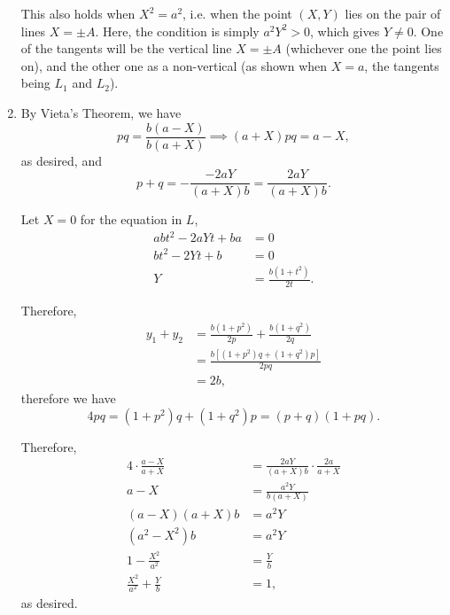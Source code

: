 \begin{enumerate}
    This also holds when \(X^2 = a^2\), i.e. when the point \((X, Y)\) lies on the pair of lines \(X = \pm A\). Here, the condition is simply \(a^2 Y^2 > 0\), which gives \(Y \neq 0\). One of the tangents will be the vertical line \(X = \pm A\) (whichever one the point lies on), and the other one as a non-vertical (as shown when \(X = a\), the tangents being \(L_1\) and \(L_2\)).

    \begin{center}
        
    \end{center}

    \item By Vieta's Theorem, we have
    \[
        pq = \frac{b(a-X)}{b(a+X)} \implies (a+X) pq = a-X,
    \]
    as desired, and
    \[
        p + q = -\frac{-2aY}{(a+X)b} = \frac{2aY}{(a+X)b}.
    \]

    Let \(X = 0\) for the equation in \(L\),
    \begin{align*}
        abt^2 - 2aYt + ba &= 0\\
        bt^2 - 2Yt + b &= 0\\
        Y &= \frac{b(1+t^2)}{2t}.
    \end{align*}

    Therefore,
    \begin{align*}
        y_1 + y_2 &= \frac{b(1+p^2)}{2p} + \frac{b(1+q^2)}{2q}\\
        &= \frac{b\left[(1+p^2)q + (1+q^2)p\right]}{2pq}\\
        &= 2b,
    \end{align*}
    therefore we have
    \[
        4pq = (1+p^2)q + (1+q^2)p = (p+q)(1 + pq).
    \]

    Therefore,
    \begin{align*}
        4 \cdot \frac{a-X}{a+X} &= \frac{2aY}{(a+X)b} \cdot \frac{2a}{a+X}\\
        a-X &= \frac{a^2 Y}{b(a+X)}\\
        (a-X)(a+X)b &= a^2Y\\
        (a^2 - X^2) b &= a^2 Y\\
        1 - \frac{X^2}{a^2} &= \frac{Y}{b}\\
        \frac{X^2}{a^2} + \frac{Y}{b} &= 1,
    \end{align*}
    as desired.
\end{enumerate}